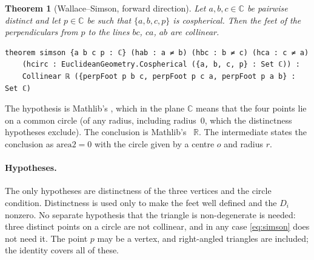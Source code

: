 \documentclass[11pt]{article}
\newtheorem{theorem}{Theorem}
\theoremstyle{definition}
\theoremstyle{remark}
\newcommand{\RR}{\mathbb{R}}
\newcommand{\CC}{\mathbb{C}}
\begin{document}
\begin{theorem}[Wallace--Simson, forward direction]\label{thm:simson}
Let $a,b,c\in\CC$ be pairwise distinct and let $p\in\CC$ be such that $\{a,b,c,p\}$ is
cospherical. Then the feet of the perpendiculars from $p$ to the lines $bc$, $ca$, $ab$ are
collinear.
\end{theorem}

\begin{lstlisting}
theorem simson {a b c p : ℂ} (hab : a ≠ b) (hbc : b ≠ c) (hca : c ≠ a)
    (hcirc : EuclideanGeometry.Cospherical ({a, b, c, p} : Set ℂ)) :
    Collinear ℝ ({perpFoot p b c, perpFoot p c a, perpFoot p a b} : Set ℂ)
\end{lstlisting}

The hypothesis is Mathlib's , which in the plane $\CC$ means
that the four points lie on a common circle (of any radius, including radius~0, which the
distinctness hypotheses exclude). The conclusion is Mathlib's ~$\RR$. The
intermediate  states the conclusion as $\mathrm{area2}=0$ with the
circle given by a centre $o$ and radius $r$.

\paragraph{Hypotheses.} The only hypotheses are distinctness of the three vertices and the circle
condition. Distinctness is used only to make the feet well defined and the $D_i$ nonzero. No
separate hypothesis that the triangle is non-degenerate is needed: three distinct points on a
circle are not collinear, and in any case \eqref{eq:simson} does not need it. The point $p$ may be
a vertex, and right-angled triangles are included; the identity covers all of these.
\end{document}
